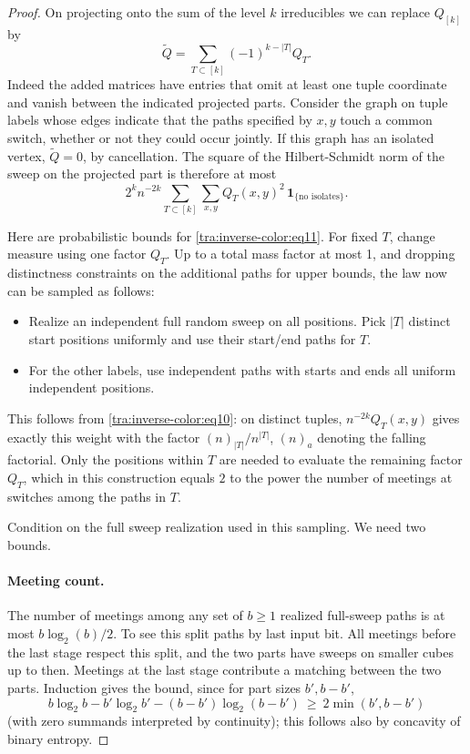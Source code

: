 \begin{proof}
On projecting onto the sum of the level \(k\) irreducibles we can replace \(Q_{[k]}\) by
\[
                    \widetilde Q=\sum_{T\subset [k]} (-1)^{k-|T|} Q_T .
\]
Indeed the added matrices have entries that omit at least one tuple coordinate and vanish between the indicated projected parts. Consider the graph on tuple labels whose edges indicate that the paths specified by \(x,y\) touch a common switch, whether or not they could occur jointly. If this graph has an isolated vertex, \(\widetilde Q=0\), by cancellation. The square of the Hilbert-Schmidt norm of the sweep on the projected part is therefore at most
\begin{equation}
             2^k n^{-2k}
               \sum_{T\subset[k]} \sum_{x,y}
                           Q_T(x,y)^2\, \mathbf 1_{\{\text{no isolates}\}}.   \label{tra:inverse-color:eq11}
\end{equation}

Here are probabilistic bounds for \eqref{tra:inverse-color:eq11}. For fixed \(T\), change measure using one factor \(Q_T\). Up to a total mass factor at most 1, and dropping distinctness constraints on the additional paths for upper bounds, the law now can be sampled as follows:
\begin{itemize}
\item Realize an independent full random sweep on all positions. Pick \(|T|\) distinct start positions uniformly and use their start/end paths for \(T\).
\item For the other labels, use independent paths with starts and ends all uniform independent positions.

\end{itemize}
This follows from \eqref{tra:inverse-color:eq10}: on distinct tuples, \(n^{-2k}Q_T(x,y)\) gives exactly this weight with the factor \((n)_{|T|}/n^{|T|}\), \((n)_a\) denoting the falling factorial. Only the positions within \(T\) are needed to evaluate the remaining factor \(Q_T\), which in this construction equals \(2\) to the power the number of meetings at switches among the paths in \(T\).

Condition on the full sweep realization used in this sampling. We need two bounds.
\paragraph{Meeting count.} The number of meetings among any set of \(b\ge1\) realized full-sweep paths is at most \(b\log_2(b)/2\). To see this split paths by last input bit. All meetings before the last stage respect this split, and the two parts have sweeps on smaller cubes up to then. Meetings at the last stage contribute a matching between the two parts. Induction gives the bound, since for part sizes \(b',b-b'\),
\[
        b\log_2 b-b'\log_2 b'-(b-b')\log_2(b-b')
                            \ \ge\ 2\min(b',b-b')
\]
(with zero summands interpreted by continuity); this follows also by concavity of binary entropy.

\end{proof}
